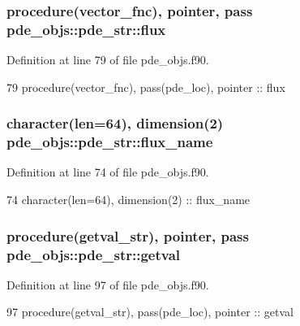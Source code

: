 \subsubsection[{flux}]{\setlength{\rightskip}{0pt plus 5cm}procedure({\bf vector\+\_\+fnc}), pointer, pass pde\+\_\+objs\+::pde\+\_\+str\+::flux}\label{structpde__objs_1_1pde__str_a218127a5b8ba05abc6340a65595ae95b}


Definition at line 79 of file pde\+\_\+objs.\+f90.


\begin{DoxyCode}
79     \textcolor{keywordtype}{procedure}(vector_fnc), pass(pde\_loc), \textcolor{keywordtype}{pointer}    :: flux
\end{DoxyCode}
\subsubsection[{flux\+\_\+name}]{\setlength{\rightskip}{0pt plus 5cm}character(len=64), dimension(2) pde\+\_\+objs\+::pde\+\_\+str\+::flux\+\_\+name}\label{structpde__objs_1_1pde__str_a948b661b081b00bd28d945df029172ff}


Definition at line 74 of file pde\+\_\+objs.\+f90.


\begin{DoxyCode}
74     \textcolor{keywordtype}{character(len=64)}, \textcolor{keywordtype}{dimension(2)}                  :: flux\_name
\end{DoxyCode}
\subsubsection[{getval}]{\setlength{\rightskip}{0pt plus 5cm}procedure({\bf getval\+\_\+str}), pointer, pass pde\+\_\+objs\+::pde\+\_\+str\+::getval}\label{structpde__objs_1_1pde__str_aaba85d314cdfdb54bfdbe77550b7e863}


Definition at line 97 of file pde\+\_\+objs.\+f90.


\begin{DoxyCode}
97     \textcolor{keywordtype}{procedure}(getval_str), pass(pde\_loc), \textcolor{keywordtype}{pointer} :: getval
\end{DoxyCode}
